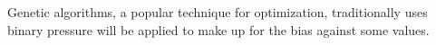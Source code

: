 \thispagestyle{empty}

Genetic algorithms, a popular technique for optimization, traditionally uses binary pressure will be applied to make up for the bias against some values.  
